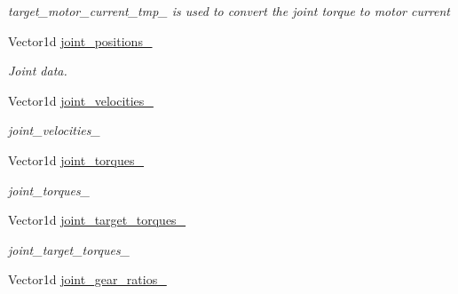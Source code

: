 \begin{DoxyCompactItemize}
\begin{DoxyCompactList}\small\item\em target\+\_\+motor\+\_\+current\+\_\+tmp\+\_\+ is used to convert the joint torque to motor current \end{DoxyCompactList}\item 
Vector1d \hyperlink{classblmc__robots_1_1SingleMotor_aabf1cdb3cef190305e336d3c9dcc57ea}{joint\+\_\+positions\+\_\+}
\begin{DoxyCompactList}\small\item\em Joint data. \end{DoxyCompactList}\item 
Vector1d \hyperlink{classblmc__robots_1_1SingleMotor_aa23bcf53779b381c1456b136f2a4a49c}{joint\+\_\+velocities\+\_\+}\hypertarget{classblmc__robots_1_1SingleMotor_aa23bcf53779b381c1456b136f2a4a49c}{}\label{classblmc__robots_1_1SingleMotor_aa23bcf53779b381c1456b136f2a4a49c}

\begin{DoxyCompactList}\small\item\em joint\+\_\+velocities\+\_\+ \end{DoxyCompactList}\item 
Vector1d \hyperlink{classblmc__robots_1_1SingleMotor_ab986b97deafb5757a410bb345441061a}{joint\+\_\+torques\+\_\+}\hypertarget{classblmc__robots_1_1SingleMotor_ab986b97deafb5757a410bb345441061a}{}\label{classblmc__robots_1_1SingleMotor_ab986b97deafb5757a410bb345441061a}

\begin{DoxyCompactList}\small\item\em joint\+\_\+torques\+\_\+ \end{DoxyCompactList}\item 
Vector1d \hyperlink{classblmc__robots_1_1SingleMotor_abe76b9fff81ee4ef1826333cbff81c25}{joint\+\_\+target\+\_\+torques\+\_\+}\hypertarget{classblmc__robots_1_1SingleMotor_abe76b9fff81ee4ef1826333cbff81c25}{}\label{classblmc__robots_1_1SingleMotor_abe76b9fff81ee4ef1826333cbff81c25}

\begin{DoxyCompactList}\small\item\em joint\+\_\+target\+\_\+torques\+\_\+ \end{DoxyCompactList}\item 
Vector1d \hyperlink{classblmc__robots_1_1SingleMotor_a18b52ed3777aa38a36e91ab3b4dc81fe}{joint\+\_\+gear\+\_\+ratios\+\_\+}\hypertarget{classblmc__robots_1_1SingleMotor_a18b52ed3777aa38a36e91ab3b4dc81fe}{}\label{classblmc__robots_1_1SingleMotor_a18b52ed3777aa38a36e91ab3b4dc81fe}


\end{DoxyCompactItemize}
